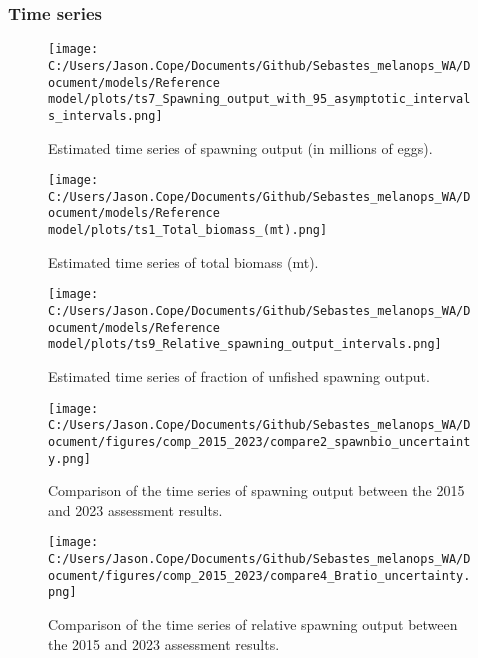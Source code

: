 \documentclass[11pt,
  english,
  letterpaper,
]{article}
\begin{document}
\pagebreak

\hypertarget{time-series}{%
\subsubsection{Time series}\label{time-series}}

\begin{figure}
\centering
\texttt{[image: C:/Users/Jason.Cope/Documents/Github/Sebastes\_melanops\_WA/Document/models/Reference model/plots/ts7\_Spawning\_output\_with\_95\_asymptotic\_intervals\_intervals.png]}
\caption{Estimated time series of spawning output (in millions of eggs).\label{fig:ssb}}
\end{figure}

\pagebreak

\begin{figure}
\centering
\texttt{[image: C:/Users/Jason.Cope/Documents/Github/Sebastes\_melanops\_WA/Document/models/Reference model/plots/ts1\_Total\_biomass\_(mt).png]}
\caption{Estimated time series of total biomass (mt).\label{fig:tot-bio}}
\end{figure}

\pagebreak

\begin{figure}
\centering
\texttt{[image: C:/Users/Jason.Cope/Documents/Github/Sebastes\_melanops\_WA/Document/models/Reference model/plots/ts9\_Relative\_spawning\_output\_intervals.png]}
\caption{Estimated time series of fraction of unfished spawning output.\label{fig:depl}}
\end{figure}

\pagebreak

\begin{figure}
\centering
\texttt{[image: C:/Users/Jason.Cope/Documents/Github/Sebastes\_melanops\_WA/Document/figures/comp\_2015\_2023/compare2\_spawnbio\_uncertainty.png]}
\caption{Comparison of the time series of spawning output between the 2015 and 2023 assessment results.\label{fig:comp_ssb}}
\end{figure}

\pagebreak

\begin{figure}
\centering
\texttt{[image: C:/Users/Jason.Cope/Documents/Github/Sebastes\_melanops\_WA/Document/figures/comp\_2015\_2023/compare4\_Bratio\_uncertainty.png]}
\caption{Comparison of the time series of relative spawning output between the 2015 and 2023 assessment results.\label{fig:comp_depl}}
\end{figure}
\end{document}
